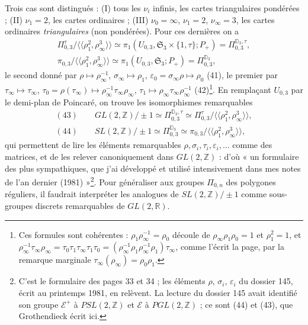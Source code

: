 \documentclass[11pt,a4paper]{article}
\begin{document}
Trois cas sont distingués : (I) tous les $\nu_i$ infinis, les cartes
triangulaires pondérées ; (II) $\nu_1 = 2$, les cartes ordinaires ; (III)
$\nu_0 = \infty$, $\nu_1 = 2$, $\nu_\infty = 3$, les cartes ordinaires
\emph{triangulaires} (non pondérées). Pour ces dernières on a
\[
\begin{gathered}
\Pi^{\tau}_{0,3}/\langle\langle \rho_1^2, \rho_\infty^3 \rangle\rangle \simeq \pi_1(U_{0,3}, \mathfrak{S}_3 \times \{1, \tau\}; P_+) = \Pi^{\mathbb{D}_3,\tau}_{0,3}, \\
\pi_{0,3}/\langle\langle \rho_1^2, \rho_\infty^3 \rangle\rangle \simeq \pi_1(U_{0,3}, \mathfrak{S}_3; P_+) = \Pi^{\mathbb{D}_3}_{0,3},
\end{gathered}
\]
le second donné par $\rho \mapsto \rho_\infty^{-1}$, $\sigma_\infty \mapsto \rho_1$,
$\varepsilon_0 = \sigma_\infty\rho \mapsto \rho_0$ (41), le premier par
$\tau_\infty \mapsto \tau_\infty$, $\tau_0 = \rho(\tau_\infty) \mapsto \rho_\infty^{-1}\tau_\infty\rho_\infty$,
$\tau_1 \mapsto \rho_\infty\tau_\infty\rho_\infty^{-1}$ (42)\footnote{Ces
formules sont cohérentes : $\rho_1\rho_\infty^{-1} = \rho_0$ découle de
$\rho_\infty\rho_1\rho_0 = 1$ et $\rho_1^2 = 1$, et
$\rho_\infty^{-1}\tau_\infty\rho_\infty = \tau_0\tau_1\tau_\infty\tau_1\tau_0 = (\rho_\infty^{-1}\rho_1\rho_\infty^{-1}\rho_1)\tau_\infty$,
comme l'écrit la page, par la remarque marginale
$\tau_\infty(\rho_\infty) = \rho_0\rho_1$.}. En remplaçant $U_{0,3}$ par le
demi-plan de Poincaré, on trouve les isomorphismes remarquables
\[
\begin{gathered}
(43)\qquad GL(2, \mathbb{Z})/\pm 1 \simeq \Pi^{\mathbb{D}_3,\tau}_{0,3} \simeq \Pi^{\tau}_{0,3}/\langle\langle \rho_1^2, \rho_\infty^3 \rangle\rangle, \\
(44)\qquad SL(2, \mathbb{Z})/\pm 1 \simeq \Pi^{\mathbb{D}_3}_{0,3} \simeq \pi_{0,3}/\langle\langle \rho_1^2, \rho_\infty^3 \rangle\rangle,
\end{gathered}
\]
qui permettent de lire les éléments remarquables $\rho, \sigma_i, \tau_i, \varepsilon_i, \ldots$
comme des matrices, et de les relever canoniquement dans $GL(2, \mathbb{Z})$ :
d'où « un formulaire des plus sympathiques, que j'ai développé et utilisé
intensivement dans mes notes de l'an dernier (1981) »\footnote{C'est le
formulaire des pages 33 et 34 ; les éléments $\rho$, $\sigma_i$, $\varepsilon_i$
du dossier 145, écrit au printemps 1981, en relèvent. La lecture du dossier
145 avait identifié son groupe $\mathcal{E}^+$ à $PSL(2, \mathbb{Z})$ et
$\mathcal{E}$ à $PGL(2, \mathbb{Z})$ ; ce sont (44) et (43), que
Grothendieck écrit ici.}. Pour généraliser aux groupes $\Pi_{0,n}$ des polygones
réguliers, il faudrait interpréter les analogues de $SL(2, \mathbb{Z})/\pm 1$
comme sous-groupes discrets remarquables de $GL(2, \mathbb{R})$.
\end{document}
